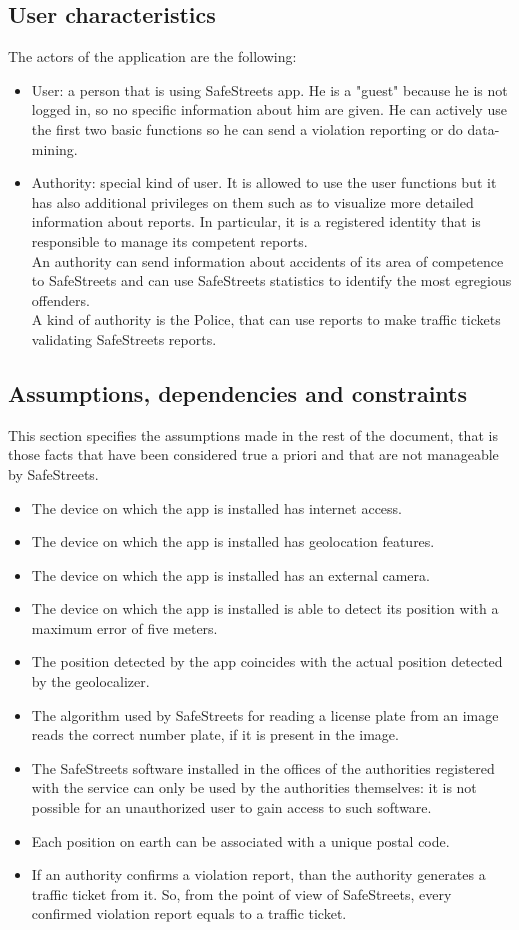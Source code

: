 \documentclass{article}
\newcommand\assumption[1]{\item[{[A#1]}] }
\begin{document}
		\subsection{User characteristics}
			The actors of the application are the following:
			\begin{itemize}
				\item User: a person that is using SafeStreets app. He is a "guest" because he is not logged in, so no specific information about him are given. He can actively use the first two basic functions so he can send a violation reporting or do data-mining.
				\item Authority: special kind of user. It is allowed to use the user functions but it has also additional privileges on them such as to visualize more detailed information about reports. In particular, it is a registered identity that is responsible to manage its competent reports.\\
				An authority can send information about accidents of its area of competence to SafeStreets and can use SafeStreets statistics to identify the most egregious offenders.\\
		        A kind of authority is the Police, that can use reports to make traffic tickets validating SafeStreets reports.
			\end{itemize}
		
		\subsection{Assumptions, dependencies and constraints}	\label{assumptions}
			This section specifies the assumptions made in the rest of the document, that is those facts that have been considered true a priori and that are not manageable by SafeStreets.
			\begin{itemize}
				\assumption{1} The device on which the app is installed has internet access.
				\assumption{2} The device on which the app is installed has geolocation features.
				\assumption{3} The device on which the app is installed has an external camera.
				\assumption{4} The device on which the app is installed is able to detect its position with a maximum error of five meters.
				\assumption{5} The position detected by the app coincides with the actual position detected by the geolocalizer.
				\assumption{6} The algorithm used by SafeStreets for reading a license plate from an image reads the correct number plate, if it is present in the image.
				\assumption{7} The SafeStreets software installed in the offices of the authorities registered with the service can only be used by the authorities themselves: it is not possible for an unauthorized user to gain access to such software.
				\assumption{8} Each position on earth can be associated with a unique postal code.
				\assumption{9} If an authority confirms a violation report, than the authority generates a traffic ticket from it. So, from the point of view of SafeStreets, every confirmed violation report equals to a traffic ticket.
				
			\end{itemize}
	
\end{document}
